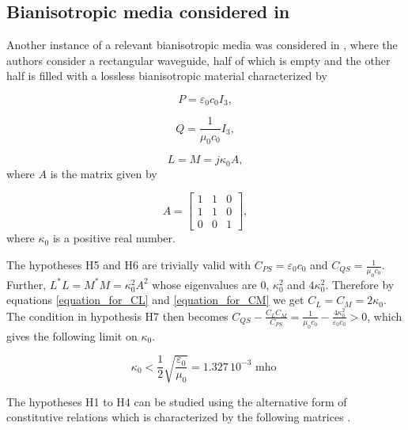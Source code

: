 \subsection{Bianisotropic media considered in \cite{alottocodecasa}}
Another instance of a relevant bianisotropic media was considered in 
\cite{alottocodecasa}, where the authors consider a rectangular waveguide, 
half of which is empty and the other half is filled with a lossless bianisotropic material characterized by 

\begin{equation} \label{constitutive_alotto_P}
P = \varepsilon_0c_0 I_3,
\end{equation}

\begin{equation} \label{constitutive_alotto_Q}
Q = \frac{1}{\mu_0c_0} I_3, 
\end{equation}

\begin{equation} \label{constitutive_alotto_LM}
L = M = j\kappa_0 A ,
\end{equation}
where $A$ is the matrix given by

\begin{equation} \label{constitutive_alotto_LM}
A= 
\begin{bmatrix}
1 & 1 & 0 \\
1 & 1 & 0 \\
0 & 0 & 1 
\end{bmatrix},
\end{equation}
where $\kappa_0$ is a positive real number.

The hypotheses H5 and H6 are trivially valid with $C_{PS} = \varepsilon_0c_0$ and
$C_{QS} = \frac{1}{\mu_0c_0}$.
Further, $L^*L = M^*M =  \kappa_0^2A^2$ whose eigenvalues are 0, $\kappa_0^2$ and $4\kappa_0^2$.
Therefore by equations \eqref{equation_for_CL} and \eqref{equation_for_CM} we get $C_L = C_M = 2\kappa_0$.
The condition in hypothesis H7 then becomes 
$C_{QS} - \frac{C_L C_M}{C_{PS}} = \frac{1}{\mu_0c_0} - \frac{4\kappa_0^2}{\varepsilon_0c_0} > 0$, 
which gives the following limit on $\kappa_0$.

\begin{equation} \label{eq:uniqueness_cond_alotto_codecasa}
\kappa_0 < \frac{1}{2}\sqrt{\frac{\varepsilon_0}{\mu_0}} = 1.327 \, 10^{-3}   \text{ mho }
\end{equation}

The hypotheses H1 to H4 can be studied using the alternative form of constitutive relations
which is characterized by the following matrices \cite{noiregolarita}.

